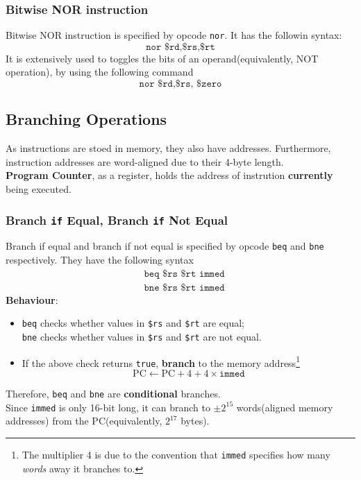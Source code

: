 \documentclass[12pt]{article}
\theoremstyle{definition}
\begin{document}
\subsubsection{Bitwise NOR instruction}
Bitwise NOR instruction is specified by opcode \texttt{nor}. It has the followin syntax:
\[
\texttt{nor \$rd,\$rs,\$rt}
\]
It is extensively used to toggles the bits of an operand(equivalently, NOT operation), by using the following command
\[
\texttt{nor \$rd,\$rs, \$zero}
\]
\subsection{Branching Operations}
As instructions are stoed in memory, they also have addresses. Furthermore, instruction addresses are word-aligned due to their 4-byte length. \\\textbf{Program Counter}, as a register, holds the address of instrution \textbf{currently} being executed.\\
\subsubsection{Branch \texttt{if} Equal, Branch \texttt{if} Not Equal}
Branch if equal and branch if not equal is specified by opcode \texttt{beq} and \texttt{bne} respectively. They have the following syntax
\begin{align*}
&\texttt{beq \$rs \$rt immed}\\
&\texttt{bne \$rs \$rt immed}
\end{align*}
\textbf{Behaviour}:\\
\begin{itemize}
  \item \texttt{beq} checks whether values in \texttt{\$rs} and \texttt{\$rt} are equal;\\
  \texttt{bne} checks whether values in \texttt{\$rs} and \texttt{\$rt} are not equal.
  \item If the above check returns \texttt{true}, \textbf{branch} to the memory address\footnote{The multiplier 4 is due to the convention that \texttt{immed} specifies how many \textit{words} away it branches to.}
  \[
\text{PC}\leftarrow \text{PC}+4+4\times\texttt{immed}
  \]
\end{itemize}
Therefore, \texttt{beq} and \texttt{bne} are \textbf{conditional} branches.\\
Since \texttt{immed} is only 16-bit long, it can branch to $\pm 2^{15}$ words(aligned memory addresses) from the PC(equivalently, $2^{17}$ bytes).
\end{document}
